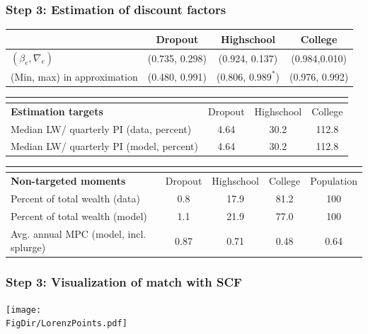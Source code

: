 \documentclass[pdflatex,aspectratio=169]{beamer}
\begin{document}
{\begin{frame}
	\frametitle{Step 3: Estimation of discount factors}
	\begin{tabular}{lccc}
		& Dropout & Highschool & College \\ \midrule
		$(\beta_e, \nabla_e)$ & (0.735, 0.298) & (0.924, 0.137) & (0.984,0.010) \\
		(Min, max) in approximation & (0.480, 0.991) & (0.806, $0.989^*$) & (0.976, 0.992) \\
		\midrule 
	\end{tabular} 
	\begin{tabular}{lccc}
		\multicolumn{4}{l}{ } \\ \midrule
		\textbf{Estimation targets} & Dropout & Highschool & College \\ \midrule
		Median LW/ quarterly PI (data, percent) & 4.64 & 30.2 & 112.8 \\ 
		Median LW/ quarterly PI (model, percent) & 4.64 & 30.2 & 112.8 %
		\\ \midrule 
	\end{tabular} 
	\begin{tabular}{lcccc}
		\multicolumn{5}{l}{ } \\ \midrule
		\textbf{Non-targeted moments} & Dropout & Highschool & College & Population \\ \midrule
		Percent of total wealth (data) & 0.8 & 17.9 & 81.2 & 100 \\
		Percent of total wealth (model) & 1.1 & 21.9 & 77.0 & 100 \\
		Avg. annual MPC (model, incl. splurge) & 0.87 & 0.71 & 0.48 & 0.64
		\\ \bottomrule 
	\end{tabular}
\end{frame}




\begin{frame}
	\frametitle{Step 3: Visualization of match with SCF}
	\centering
	\texttt{[image: \\FigDir/LorenzPoints.pdf]}
\end{frame}


}{}
\end{document}

